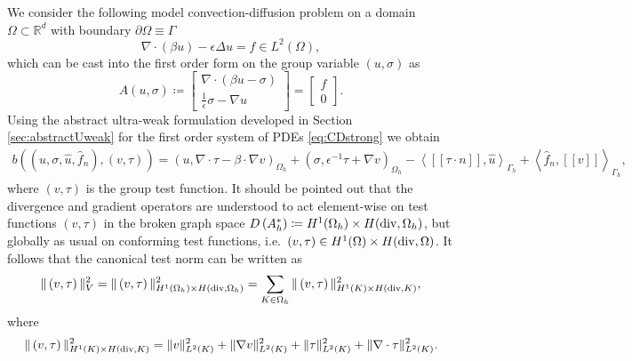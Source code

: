 \documentclass[11pt,onecolumn]{scrartcl}
\newcommand{\eqnlab}[1]{\label{eq:#1}}
\newcommand{\eqnref}[1]{\eqref{eq:#1}}
\newcommand{\secref}[1]{\ref{sec:#1}}
\newcommand{\LRp}[1]{\left( #1 \right)}
\newcommand{\LRs}[1]{\left[ #1 \right]}
\newcommand{\LRa}[1]{\left\langle #1 \right\rangle}
\newcommand{\jump}[1] {\ensuremath{\LRs{\![#1]\!}}}
\renewcommand{\L}{L^2\LRp{\Omega}}
\newcommand{\pO}{\partial\Omega}
\newcommand{\Gh}{\Gamma_h}
\newcommand{\Oh}{\Omega_h}
\newcommand{\grad}{\nabla}
\renewcommand{\div}{\grad \cdot}
\begin{document}
We consider the following model convection-diffusion problem on a domain
$\Omega \subset \mathbb{R}^d$ with boundary $\pO \equiv \Gamma$
\begin{equation}
\div (\beta u) - \epsilon\Delta u = f  \in \L \label{primal},
\end{equation}
which can be cast into the first order form on the group variable
$\LRp{u,\sigma}$ as
\begin{equation}
\eqnlab{CDstrong}
A \LRp{u,\sigma} \coloneqq \LRs {
\begin{array}{c}
\div (\beta u - \sigma) \\ \frac{1}{\epsilon}\sigma - \grad u
\end{array}} = \LRs{
\begin{array}{c}
f \\ 0
\end{array}
}.
\end{equation}
Using the abstract ultra-weak formulation developed in Section
\secref{abstractUweak} for the first order system of PDEs \eqnref{CDstrong} we
obtain
\begin{align*}
b\left(\left(u,\sigma, \widehat{u}, \widehat{f}_n\right),
\left( v, \tau \right)\right) = \left(u,\div \tau - \beta \cdot \grad
v\right)_{\Oh} + \left(\sigma, \epsilon^{-1} \tau + \grad v\right)_{\Oh} - \LRa{
\jump{\tau\cdot n}, \widehat{u} }_{\Gh} + \LRa{ \widehat{f}_n,
  \jump{v} }_{\Gh},
\end{align*}
where $\LRp{v, \tau}$ is the group test function. It should be pointed
out that the divergence and gradient operators are understood to act
element-wise on test functions $\LRp{v, \tau}$ in the broken graph
space $ D\LRp{A_h^*} \coloneqq  H^1(\Oh) \times H({\rm div}, \Oh)$, but
globally as usual on conforming test functions, i.e.\ $ \LRp{v, \tau}
\in  H^1(\Omega) \times H({\rm div}, \Omega)$. It follows that the
canonical test norm can be written as
\[
\|\left(v, \tau\right)\|_V^2 = \|\left(v, \tau\right)\|_{H^1(\Oh) \times H({\rm div},\Oh)}^2
= \sum_{K\in \Oh} \|\left(v, \tau\right)\|_{H^1(K) \times H({\rm
    div},K)}^2,
\]
where
\[
\|\left(v, \tau \right)\|_{H^1(K) \times H({\rm div},K)}^2 =
\|v\|_{L^2(K)}^2 + \|\grad v\|_{L^2(K)}^2 + \|\tau\|_{L^2(K)}^2 +
\|\div \tau\|_{L^2(K)}^2.
\]
\end{document}
